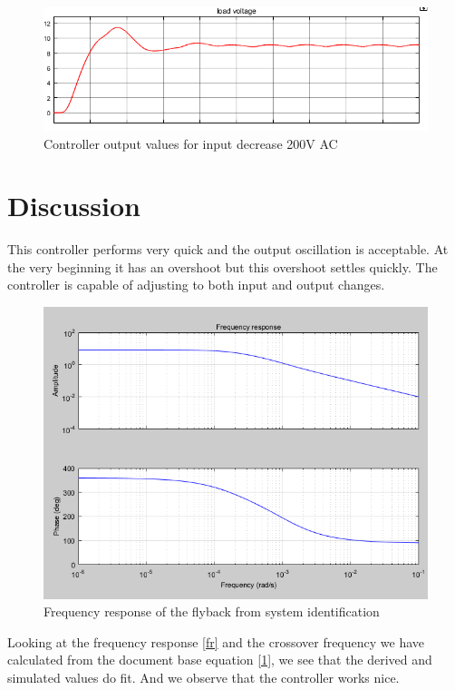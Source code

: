 \documentclass[12pt]{article}
\begin{document}
\begin{figure}[H]
    \centering
    \includegraphics[width=14cm]{d4}
    \caption{Controller output values for input decrease 200V AC}
    \label{fig:d2}
\end{figure}

\section{Discussion}

This controller performs very quick and the output oscillation is acceptable. At the very beginning it has an overshoot but this overshoot settles quickly. The controller is capable of adjusting to both input and output changes. 

\begin{figure}
    \centering
    \includegraphics{frequency_resoinse}
    \caption{Frequency response of the flyback from system identification}
    \label{fig:fr}
\end{figure}

Looking at the frequency response \ref{fr} and the crossover frequency we have calculated from the document base equation \ref{1}, we see that the derived and simulated values do fit. And we observe that the controller works nice.
\newpage
\end{document}
